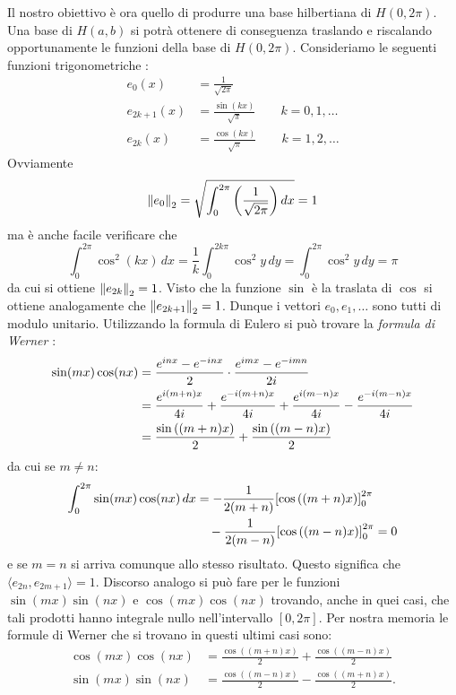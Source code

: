 Il nostro obiettivo è ora quello di produrre una base hilbertiana di $H(0,2\pi)$.
Una base di $H(a,b)$ si potrà ottenere di conseguenza traslando e riscalando opportunamente le funzioni della base di $H(0,2\pi)$.
Consideriamo le seguenti funzioni trigonometriche%
%
:
\begin{equation}\label{eq:54741346}
\begin{aligned}
  e_0 (x) &= \frac{1}{\sqrt{2\pi}} \\
  e_{2k+1}(x) &= \frac{\sin(kx)}{\sqrt{\pi}} \qquad k=0,1,\dots\\
  e_{2k}(x) &= \frac{\cos(kx)}{\sqrt{\pi}} \qquad k=1,2,\dots
\end{aligned}
\end{equation}
Ovviamente
\[
  {\left\Vert e_0\right\Vert}_2=\sqrt{\int_{0}^{2\pi} {\left( \frac{1}{\sqrt{2\pi}} \right)}\, dx} = 1
\]
ma è anche facile verificare che
\[
  \int_{0}^{2\pi} \cos^2 (kx)\, dx
  = \frac{1}{k}\int_{0}^{2k\pi} \cos^2 y\, dy
  = \int_{0}^{2\pi} \cos^2 y\, dy = \pi
\]
da cui si ottiene ${\left\Vert e_{2k}\right\Vert}_2 = 1$.
Visto che la funzione $\sin$ è la traslata di $\cos$ si
ottiene analogamente che ${\left\Vert e_{2k+1}\right\Vert}_2=1$.
Dunque i vettori $e_0,e_1,\dots$ sono tutti di modulo unitario.
Utilizzando la formula di Eulero
si può trovare la \emph{formula di Werner}%
:
%
%
\begin{align*}
 \sin(mx)\cos(nx)
 &= \frac{e^{inx}-e^{-inx}}{2}\cdot \frac{e^{imx}-e^{-imn}}{2i}\\
 &= \frac{e^{i(m+n)x}}{4i} + \frac{e^{-i(m+n)x}}{4i} + \frac{e^{i(m-n)x}}{4i} - \frac{e^{-i(m-n)x}}{4i}\\
 &= \frac{\sin{\left( (m+n)x \right)}}{2} + \frac{\sin{\left( (m-n)x \right)}}{2}
\end{align*}
da cui se $m\neq n$:
\begin{align*}
 \int_{0}^{2\pi} \sin(mx)\cos(nx)\, dx &=
 -\frac 1 {2(m+n)} {\left[ \cos{\left( (m+n)x \right)} \right]}_{0}^{2\pi} \\
  &\quad - \frac{1}{2(m-n)}{\left[ \cos{\left( (m-n)x \right)} \right]}_{0}^{2\pi} = 0
\end{align*}
e se $m=n$ si arriva comunque allo stesso risultato.
Questo significa che $\langle e_{2n},e_{2m+1}\rangle = 1$.
Discorso analogo si può fare per le funzioni $\sin(mx)\sin(nx)$ e $\cos(mx)\cos(nx)$
trovando, anche in quei casi, che tali prodotti hanno integrale nullo
nell'intervallo $[0,2\pi]$.
Per nostra memoria le formule di Werner che si trovano
in questi ultimi casi sono:
%
%
%
%
\begin{align*}
  \cos(mx) \cos(nx) &=  \frac{\cos((m+n)x)}{2} + \frac{\cos((m-n)x)}{2}\\
  \sin(mx) \sin(nx) &=  \frac{\cos((m-n)x)}{2} - \frac{\cos((m+n)x)}{2}.
\end{align*}


